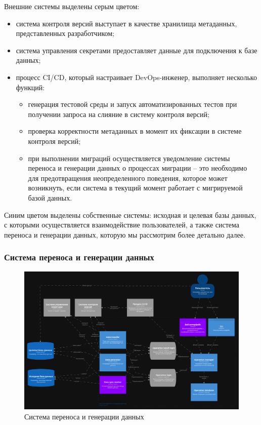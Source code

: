 Внешние системы выделены серым цветом:
\begin{itemize}
\item система контроля версий выступает в качестве хранилища метаданных, представленных разработчиком;
\item система управления секретами предоставляет данные для подключения к базе данных;
\item процесс CI/CD, который настраивает DevOps-инженер, выполняет несколько функций:
  \begin{itemize}
    \item генерация тестовой среды и запуск автоматизированных тестов при получении запроса на слияние в систему контроля версий;
    \item проверка корректности метаданных в момент их фиксации в системе контроля версий;
    \item при выполнении миграций осуществляется уведомление системы переноса и генерации данных о процессах миграции -- это необходимо для предотвращения неопределенного поведения, которое может возникнуть, если система в текущий момент работает с мигрируемой базой данных.
  \end{itemize}
\end{itemize}

Синим цветом выделены собственные системы: исходная и целевая базы данных, с которыми осуществляется взаимодействие пользователей, а также система переноса и генерации данных, которую мы рассмотрим более детально далее.

\subsubsection{Система переноса и генерации данных}

\begin{figure}
  \includegraphics[scale=0.12]{./img/structurizr-Containers.png}
  \caption{Система переноса и генерации данных}
  \label{Containers}
\end{figure}


